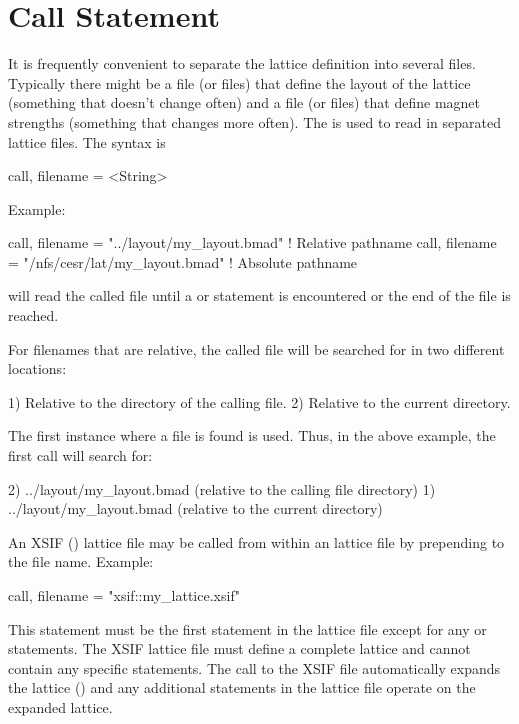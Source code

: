 \section{Call Statement}
\label{s:call}

It is frequently convenient to separate the lattice definition into
several files.  Typically there might be a file (or files) that define
the layout of the lattice (something that doesn't change often) and a
file (or files) that define magnet strengths (something that changes
more often).  The  is used to read in separated lattice
files. The syntax is
\begin{example}
  call, filename = <String>
\end{example}
Example:
\begin{example}
  call, filename = "../layout/my_layout.bmad"      ! Relative pathname
  call, filename = "/nfs/cesr/lat/my_layout.bmad"  ! Absolute pathname
\end{example}
\bmad will read the called file until a  or 
statement is encountered or the end of the file is reached.

For filenames that are relative, the called file will be searched for in
two different locations:
\begin{example}
  1) Relative to the directory of the calling file.
  2) Relative to the current directory.
\end{example}
The first instance where a file is found is used.
Thus, in the above example, the first call will search for:
\begin{example}
  2) ../layout/my_layout.bmad  (relative to the calling file directory)
  1) ../layout/my_layout.bmad  (relative to the current directory)
\end{example}

An XSIF () lattice file may be called
from within an \bmad lattice file by prepending  to the
file name. Example:
\begin{example}
  call, filename = "xsif::my_lattice.xsif"
\end{example}
This statement must be the first statement in the \bmad lattice file
except for any  or  statements. The
XSIF lattice file must define a complete lattice and cannot contain
any \bmad specific statements. The call to the XSIF file automatically
expands the lattice () and any additional statements in
the \bmad lattice file operate on the expanded lattice.

